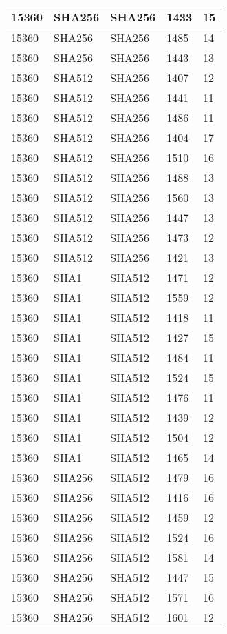 \begin{tabular}{| l | l | l | l | l |}
15360 & SHA256 & SHA256 & 1433 & 15 \\ \hline 
15360 & SHA256 & SHA256 & 1485 & 14 \\ \hline 
15360 & SHA256 & SHA256 & 1443 & 13 \\ \hline 
15360 & SHA512 & SHA256 & 1407 & 12 \\ \hline 
15360 & SHA512 & SHA256 & 1441 & 11 \\ \hline 
15360 & SHA512 & SHA256 & 1486 & 11 \\ \hline 
15360 & SHA512 & SHA256 & 1404 & 17 \\ \hline 
15360 & SHA512 & SHA256 & 1510 & 16 \\ \hline 
15360 & SHA512 & SHA256 & 1488 & 13 \\ \hline 
15360 & SHA512 & SHA256 & 1560 & 13 \\ \hline 
15360 & SHA512 & SHA256 & 1447 & 13 \\ \hline 
15360 & SHA512 & SHA256 & 1473 & 12 \\ \hline 
15360 & SHA512 & SHA256 & 1421 & 13 \\ \hline 
15360 & SHA1 & SHA512 & 1471 & 12 \\ \hline 
15360 & SHA1 & SHA512 & 1559 & 12 \\ \hline 
15360 & SHA1 & SHA512 & 1418 & 11 \\ \hline 
15360 & SHA1 & SHA512 & 1427 & 15 \\ \hline 
15360 & SHA1 & SHA512 & 1484 & 11 \\ \hline 
15360 & SHA1 & SHA512 & 1524 & 15 \\ \hline 
15360 & SHA1 & SHA512 & 1476 & 11 \\ \hline 
15360 & SHA1 & SHA512 & 1439 & 12 \\ \hline 
15360 & SHA1 & SHA512 & 1504 & 12 \\ \hline 
15360 & SHA1 & SHA512 & 1465 & 14 \\ \hline 
15360 & SHA256 & SHA512 & 1479 & 16 \\ \hline 
15360 & SHA256 & SHA512 & 1416 & 16 \\ \hline 
15360 & SHA256 & SHA512 & 1459 & 12 \\ \hline 
15360 & SHA256 & SHA512 & 1524 & 16 \\ \hline 
15360 & SHA256 & SHA512 & 1581 & 14 \\ \hline 
15360 & SHA256 & SHA512 & 1447 & 15 \\ \hline 
15360 & SHA256 & SHA512 & 1571 & 16 \\ \hline 
15360 & SHA256 & SHA512 & 1601 & 12 \\ \hline 

\end{tabular}
